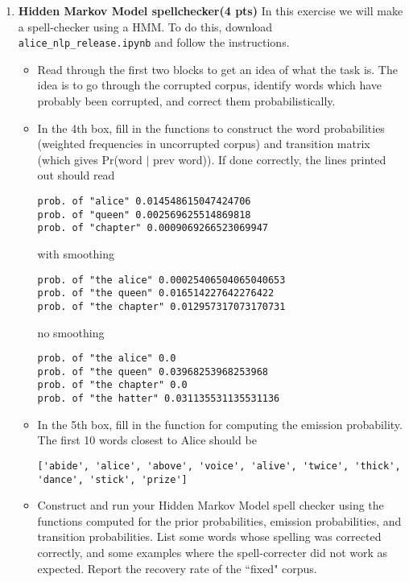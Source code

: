 \documentclass{article}
\newcommand{\showpoints}[1]{\textbf{(#1 pts)} }
\begin{document}
\begin{enumerate}
\begin{itemize}
\end{itemize}





\item \textbf{Hidden Markov Model spellchecker}\showpoints{4} 
In this exercise we will make a spell-checker using a HMM. To do this, download \texttt{alice\_nlp\_release.ipynb} and follow the instructions.

\begin{itemize}
\item Read through the first two blocks to get an idea of what the task is. The idea is to go through the corrupted corpus, identify words which have probably been corrupted, and correct them probabilistically. 

\item In the 4th box, fill in the functions to construct the word probabilities (weighted frequencies in uncorrupted corpus) and transition matrix (which gives Pr(word $|$ prev word)). If done correctly, the lines printed out should read 

\begin{verbatim}
prob. of "alice" 0.014548615047424706
prob. of "queen" 0.002569625514869818
prob. of "chapter" 0.0009069266523069947
\end{verbatim}

with smoothing

\begin{verbatim}
prob. of "the alice" 0.00025406504065040653
prob. of "the queen" 0.016514227642276422
prob. of "the chapter" 0.012957317073170731
\end{verbatim}

no smoothing

\begin{verbatim}
prob. of "the alice" 0.0
prob. of "the queen" 0.03968253968253968
prob. of "the chapter" 0.0
prob. of "the hatter" 0.031135531135531136
\end{verbatim}

\item In the 5th box, fill in the function for computing the emission probability. The first 10 words closest to Alice should be 

\begin{verbatim}
['abide', 'alice', 'above', 'voice', 'alive', 'twice', 'thick', 'dance', 'stick', 'prize']
\end{verbatim}

\item Construct and run your Hidden Markov Model spell checker using the functions computed for the prior probabilities, emission probabilities, and transition probabilities. List some words whose spelling was corrected correctly, and some examples where the spell-correcter did not work as expected. Report the recovery rate of the ``fixed" corpus.



\end{itemize}







\end{enumerate}
\end{document}
